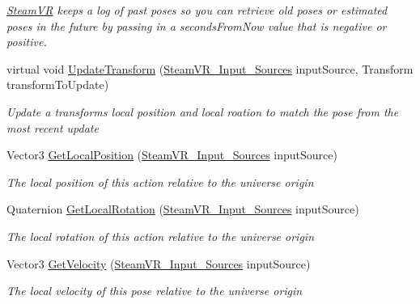 \begin{DoxyCompactItemize}
\begin{DoxyCompactList}\small\item\em \mbox{\hyperlink{class_valve_1_1_v_r_1_1_steam_v_r}{Steam\+VR}} keeps a log of past poses so you can retrieve old poses or estimated poses in the future by passing in a seconds\+From\+Now value that is negative or positive. \end{DoxyCompactList}\item 
virtual void \mbox{\hyperlink{class_valve_1_1_v_r_1_1_steam_v_r___action___pose___base_a95ffd5217a271d75ca471c9ccdf36215}{Update\+Transform}} (\mbox{\hyperlink{namespace_valve_1_1_v_r_a82e5bf501cc3aa155444ee3f0662853f}{Steam\+V\+R\+\_\+\+Input\+\_\+\+Sources}} input\+Source, Transform transform\+To\+Update)
\begin{DoxyCompactList}\small\item\em Update a transform\textquotesingle{}s local position and local roation to match the pose from the most recent update \end{DoxyCompactList}\item 
Vector3 \mbox{\hyperlink{class_valve_1_1_v_r_1_1_steam_v_r___action___pose___base_ab007b14bb04c5d6fc1564ac4ffac1772}{Get\+Local\+Position}} (\mbox{\hyperlink{namespace_valve_1_1_v_r_a82e5bf501cc3aa155444ee3f0662853f}{Steam\+V\+R\+\_\+\+Input\+\_\+\+Sources}} input\+Source)
\begin{DoxyCompactList}\small\item\em The local position of this action relative to the universe origin \end{DoxyCompactList}\item 
Quaternion \mbox{\hyperlink{class_valve_1_1_v_r_1_1_steam_v_r___action___pose___base_a4cd01c8865799b4abdb3aa05c9bce7a1}{Get\+Local\+Rotation}} (\mbox{\hyperlink{namespace_valve_1_1_v_r_a82e5bf501cc3aa155444ee3f0662853f}{Steam\+V\+R\+\_\+\+Input\+\_\+\+Sources}} input\+Source)
\begin{DoxyCompactList}\small\item\em The local rotation of this action relative to the universe origin \end{DoxyCompactList}\item 
Vector3 \mbox{\hyperlink{class_valve_1_1_v_r_1_1_steam_v_r___action___pose___base_a827a230f97d4cb064be1b679440a3593}{Get\+Velocity}} (\mbox{\hyperlink{namespace_valve_1_1_v_r_a82e5bf501cc3aa155444ee3f0662853f}{Steam\+V\+R\+\_\+\+Input\+\_\+\+Sources}} input\+Source)
\begin{DoxyCompactList}\small\item\em The local velocity of this pose relative to the universe origin \end{DoxyCompactList}\item 

\end{DoxyCompactItemize}
